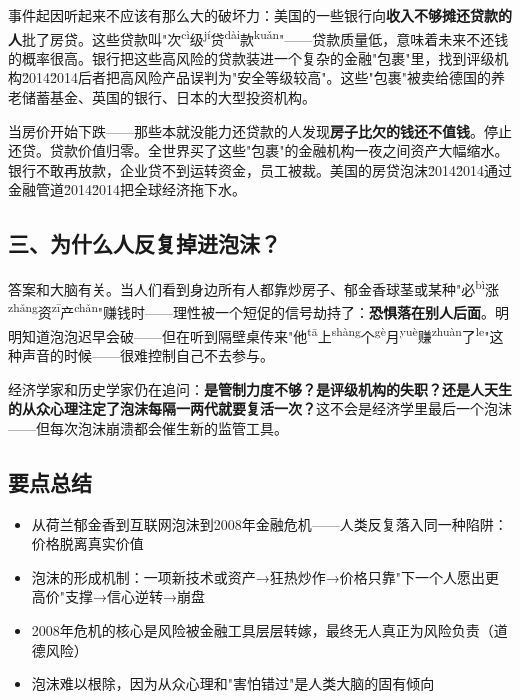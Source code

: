 \documentclass[a4paper,12pt]{ctexart}
\newcommand{\ruby}[2]{#1\textsuperscript{#2}}
\begin{document}
事件起因听起来不应该有那么大的破坏力：美国的一些银行向\textbf{收入不够摊还贷款的人}批了房贷。这些贷款叫"\ruby{次}{cì}\ruby{级}{jí}\ruby{贷}{dài}\ruby{款}{kuǎn}"——贷款质量低，意味着未来不还钱的概率很高。银行把这些高风险的贷款装进一个复杂的金融"包裹"里，找到评级机构\u2014\u2014后者把高风险产品误判为"安全等级较高"。这些"包裹"被卖给德国的养老储蓄基金、英国的银行、日本的大型投资机构。

当房价开始下跌——那些本就没能力还贷款的人发现\textbf{房子比欠的钱还不值钱}。停止还贷。贷款价值归零。全世界买了这些"包裹"的金融机构一夜之间资产大幅缩水。银行不敢再放款，企业贷不到运转资金，员工被裁。美国的房贷泡沫\u2014\u2014通过金融管道\u2014\u2014把全球经济拖下水。

\subsection*{三、为什么人反复掉进泡沫？}

答案和大脑有关。当人们看到身边所有人都靠炒房子、郁金香球茎或某种"\ruby{必}{bì}\ruby{涨}{zhǎng}\ruby{资}{zī}\ruby{产}{chǎn}"赚钱时——理性被一个短促的信号劫持了：\textbf{恐惧落在别人后面}。明明知道泡泡迟早会破——但在听到隔壁桌传来"\ruby{他}{tā}\ruby{上}{shàng}\ruby{个}{gè}\ruby{月}{yuè}\ruby{赚}{zhuàn}\ruby{了}{le}"这种声音的时候——很难控制自己不去参与。

经济学家和历史学家仍在追问：\textbf{是管制力度不够？是评级机构的失职？还是人天生的从众心理注定了泡沫每隔一两代就要复活一次？}这不会是经济学里最后一个泡沫——但每次泡沫崩溃都会催生新的监管工具。

\subsection*{要点总结}
\begin{itemize}
  \item 从荷兰郁金香到互联网泡沫到2008年金融危机——人类反复落入同一种陷阱：价格脱离真实价值
  \item 泡沫的形成机制：一项新技术或资产→狂热炒作→价格只靠"下一个人愿出更高价"支撑→信心逆转→崩盘
  \item 2008年危机的核心是风险被金融工具层层转嫁，最终无人真正为风险负责（道德风险）
  \item 泡沫难以根除，因为从众心理和"害怕错过"是人类大脑的固有倾向
\end{itemize}
\end{document}
